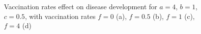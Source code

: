 \begin{figure}[H]
    \caption{Vaccination rates effect on disease development for $a=4$, $b=1$, $c=0.5$, with vaccination rates $f=0$ (a), $f=0.5$ (b), $f=1$ (c), $f=4$ (d)}
    \label{fig:earlyvacc}
\end{figure}
